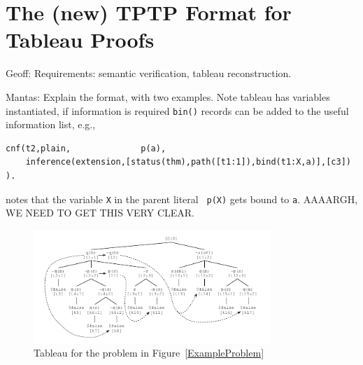 \documentclass[runningheads]{llncs}
\begin{document}
\section{The (new) TPTP Format for Tableau Proofs}
\label{Tableau}

Geoff: Requirements: semantic verification, tableau reconstruction.

Mantas: Explain the format, with two examples.
Note tableau has variables instantiated, if information is required {\tt bin()} records can be
added to the useful information list, e.g., 

\begin{verbatim}
cnf(t2,plain,              p(a),
    inference(extension,[status(thm),path([t1:1]),bind(t1:X,a)],[c3]) ).
\end{verbatim}

notes that the variable {\tt X} in the parent literal {\tt ~p(X)} gets bound to {\tt a}.
AAAARGH, WE NEED TO GET THIS VERY CLEAR.

\begin{figure}[htb]
\centering
\includegraphics[width=0.8\textwidth]{Tableau.pdf}
\vspace*{-1em}
\caption{Tableau for the problem in Figure~\ref{ExampleProblem}}
\label{SimpleTableau}
\end{figure}
\end{document}
